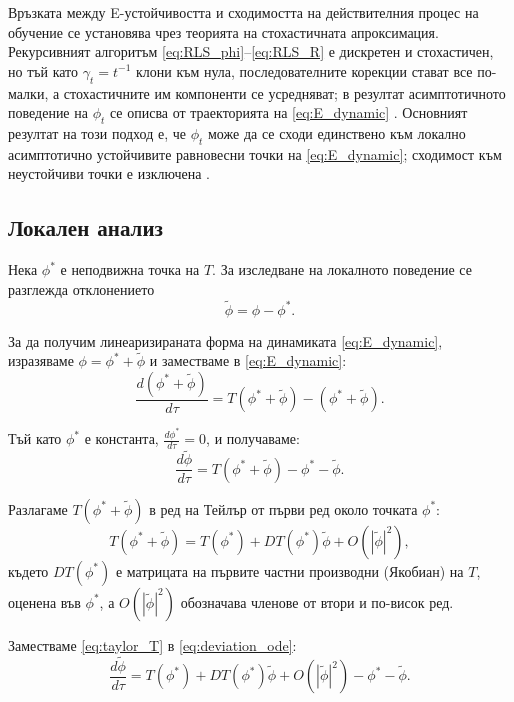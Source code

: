 Връзката между E-устойчивостта и сходимостта на действителния процес на обучение се установява чрез теорията на стохастичната апроксимация. Рекурсивният алгоритъм \eqref{eq:RLS_phi}--\eqref{eq:RLS_R} е дискретен и стохастичен, но тъй като $\gamma_t = t^{-1}$ клони към нула, последователните корекции стават все по-малки, а стохастичните им компоненти се усредняват; в резултат асимптотичното поведение на $\phi_t$ се описва от траекторията на \eqref{eq:E_dynamic} \parencite[с. 127--128]{GeorgeEvans_2001}. Основният резултат на този подход е, че $\phi_t$ може да се сходи единствено към локално асимптотично устойчивите равновесни точки на \eqref{eq:E_dynamic}; сходимост към неустойчиви точки е изключена \parencite[с. 35]{GeorgeEvans_2001}.

\subsection*{Локален анализ}

Нека $\phi^\ast$ е неподвижна точка на $T$. За изследване на локалното поведение се разглежда отклонението
\[
\tilde{\phi}=\phi-\phi^\ast.
\]

За да получим линеаризираната форма на динамиката \eqref{eq:E_dynamic}, изразяваме $\phi = \phi^* + \tilde{\phi}$ и заместваме в \eqref{eq:E_dynamic}:
\begin{equation}
\frac{d(\phi^* + \tilde{\phi})}{d\tau} = T(\phi^* + \tilde{\phi}) - (\phi^* + \tilde{\phi}).
\label{eq:substitution}
\end{equation}

Тъй като $\phi^*$ е константа, $\frac{d\phi^*}{d\tau} = 0$, и получаваме:
\begin{equation}
\frac{d\tilde{\phi}}{d\tau} = T(\phi^* + \tilde{\phi}) - \phi^* - \tilde{\phi}.
\label{eq:deviation_ode}
\end{equation}

Разлагаме $T(\phi^* + \tilde{\phi})$ в ред на Тейлър от първи ред около точката $\phi^*$:
\begin{equation}
T(\phi^* + \tilde{\phi}) = T(\phi^*) + DT(\phi^*)\tilde{\phi} + O(|\tilde{\phi}|^2),
\label{eq:taylor_T}
\end{equation}
където $DT(\phi^*)$ е матрицата на първите частни производни (Якобиан) на $T$, оценена във $\phi^*$, а $O(|\tilde{\phi}|^2)$ обозначава членове от втори и по-висок ред.

Заместваме \eqref{eq:taylor_T} в \eqref{eq:deviation_ode}:
\begin{equation}
\frac{d\tilde{\phi}}{d\tau} = T(\phi^*) + DT(\phi^*)\tilde{\phi} + O(|\tilde{\phi}|^2) - \phi^* - \tilde{\phi}.
\label{eq:substituted}
\end{equation}


